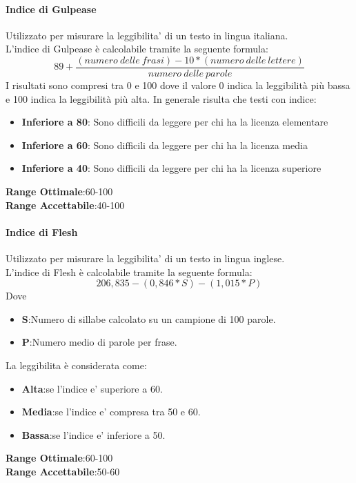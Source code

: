 \paragraph{Indice di Gulpease}
\begin{flushleft}
Utilizzato per misurare la leggibilita' di un testo in lingua italiana.\\
L'indice di Gulpease è calcolabile tramite la seguente formula:
$$
	89+\frac{(numero\:delle\:frasi)-10*(numero\:delle\:lettere)}{numero\:delle\:parole}
$$
I risultati sono compresi tra 0 e 100 dove il valore 0 indica la leggibilità più bassa e 100 indica la leggibilità più alta. In generale risulta che testi con indice:
	\begin{itemize}
		\item{\textbf{Inferiore	a 80}}: Sono difficili da leggere per chi ha la licenza elementare
		\item{\textbf{Inferiore	a 60}}: Sono difficili da leggere per chi ha la licenza media
		\item{\textbf{Inferiore	a 40}}: Sono difficili da leggere per chi ha la licenza superiore
	\end{itemize}
\textbf{Range Ottimale}:60-100 \\
\textbf{Range Accettabile}:40-100
\end{flushleft}
\paragraph{Indice di Flesh}
\begin{flushleft}
Utilizzato per misurare la leggibilita' di un testo in lingua inglese.\\
L'indice di Flesh è calcolabile tramite la seguente formula:
	$$
		206,835-(0,846*S)-(1,015*P)
	$$
Dove
	\begin{itemize}
		\item{\textbf{S}}:Numero di sillabe calcolato su un campione di 100 parole.
		\item{\textbf{P}}:Numero medio di parole per frase.
	\end{itemize}
La leggibilita è considerata come:
	\begin{itemize}
		\item{\textbf{Alta}}:se l'indice e' superiore a 60.
		\item{\textbf{Media}}:se l'indice e' compresa tra 50 e 60.
		\item{\textbf{Bassa}}:se l'indice e' inferiore a 50.
	\end{itemize}
\textbf{Range Ottimale}:60-100 \\
\textbf{Range Accettabile}:50-60
\end{flushleft}
\pagebreak
